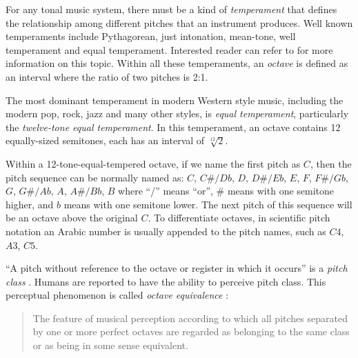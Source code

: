 For any tonal music system, there must be a kind of {\it temperament} that defines the relationship among different pitches that an instrument produces. Well known temperaments include Pythagorean, just intonation, mean-tone, well temperament and equal temperament. Interested reader can refer to \cite{barbour2004tuning} for more information on this topic. Within all these temperaments, an {\it octave} is defined as an interval where the ratio of two pitches is 2:1. %

The most dominant temperament in modern Western style music, including the modern pop, rock, jazz and many other styles, is {\it equal temperament}, particularly the {\it twelve-tone equal temperament}. In this temperament, an octave contains 12 equally-sized semitones, each has an interval of $\sqrt[12]{2} $.

Within a 12-tone-equal-tempered octave, if we name the first pitch as $C$, then the pitch sequence can be normally named as:
$C$, $C\#/Db$, $D$, $D\#/Eb$, $E$, $F$, $F\#/Gb$, $G$, $G\#/Ab$, $A$, $A\#/Bb$, $B$
where ``/'' means ``or'', $\#$ means with one semitone higher, and $b$ means with one semitone lower. The next pitch of this sequence will be an octave above the original $C$. To differentiate octaves, in scientific pitch notation \cite{tuningstandard} an Arabic number is usually appended to the pitch names, such as $C4$, $A3$, $C5$.

``A pitch without reference to the octave or register in which it occurs'' is a {\it pitch class} \cite{randel1999harvard}. Humans are reported to have the ability to perceive pitch class. This perceptual phenomenon is called {\it octave equivalence} \cite{randel1999harvard,boring1942sensation}:

\begin{quote}
The feature of musical perception according to which all pitches separated by one or more perfect octaves are regarded as belonging to the same class or as being in some sense equivalent.
\end{quote}

